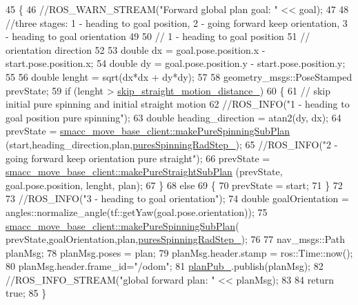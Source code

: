 \begin{DoxyCode}
45 \{
46     \textcolor{comment}{//ROS\_WARN\_STREAM("Forward global plan goal: " << goal);}
47 
48     \textcolor{comment}{//three stages: 1 - heading to goal position, 2 - going forward keep orientation, 3 - heading to goal
       orientation}
49 
50     \textcolor{comment}{// 1 - heading to goal position}
51     \textcolor{comment}{// orientation direction}
52 
53     \textcolor{keywordtype}{double} dx = goal.pose.position.x - start.pose.position.x;
54     \textcolor{keywordtype}{double} dy = goal.pose.position.y - start.pose.position.y;
55 
56     \textcolor{keywordtype}{double} lenght = sqrt(dx*dx + dy*dy);
57 
58     geometry\_msgs::PoseStamped prevState;
59     \textcolor{keywordflow}{if} (lenght > \hyperlink{classforward__global__planner_1_1ForwardGlobalPlanner_a0e10cd64069d5723fbdb896fdcead82c}{skip\_straight\_motion\_distance\_}) 
60     \{   
61         \textcolor{comment}{// skip initial pure spinning and initial straight motion}
62         \textcolor{comment}{//ROS\_INFO("1 - heading to goal position pure spinning");}
63         \textcolor{keywordtype}{double} heading\_direction = atan2(dy, dx);
64         prevState = \hyperlink{namespacesmacc__move__base__client_aa30beab025bcffa7f321d40dbb5e8970}{smacc\_move\_base\_client::makePureSpinningSubPlan}
      (start,heading\_direction,plan,\hyperlink{classforward__global__planner_1_1ForwardGlobalPlanner_aa4247993c6651700fdaf8c067de19d8f}{puresSpinningRadStep\_});
65         \textcolor{comment}{//ROS\_INFO("2 - going forward keep orientation pure straight");}
66         prevState = \hyperlink{namespacesmacc__move__base__client_a75b92d6b95689fb8f73cdca23291fdb9}{smacc\_move\_base\_client::makePureStraightSubPlan}
      (prevState, goal.pose.position,  lenght, plan);
67     \}
68     \textcolor{keywordflow}{else}
69     \{
70         prevState = start;
71     \}
72 
73     \textcolor{comment}{//ROS\_INFO("3 - heading to goal orientation");}
74     \textcolor{keywordtype}{double} goalOrientation = angles::normalize\_angle(tf::getYaw(goal.pose.orientation));
75     \hyperlink{namespacesmacc__move__base__client_aa30beab025bcffa7f321d40dbb5e8970}{smacc\_move\_base\_client::makePureSpinningSubPlan}(
      prevState,goalOrientation,plan,\hyperlink{classforward__global__planner_1_1ForwardGlobalPlanner_aa4247993c6651700fdaf8c067de19d8f}{puresSpinningRadStep\_});
76     
77     nav\_msgs::Path planMsg;
78     planMsg.poses = plan;
79     planMsg.header.stamp = ros::Time::now();
80     planMsg.header.frame\_id=\textcolor{stringliteral}{"/odom"};
81     \hyperlink{classforward__global__planner_1_1ForwardGlobalPlanner_a4b20efe94ece6437775470088095132a}{planPub\_}.publish(planMsg);
82     \textcolor{comment}{//ROS\_INFO\_STREAM("global forward plan: " << planMsg);}
83 
84     \textcolor{keywordflow}{return} \textcolor{keyword}{true};
85 \}
\end{DoxyCode}


